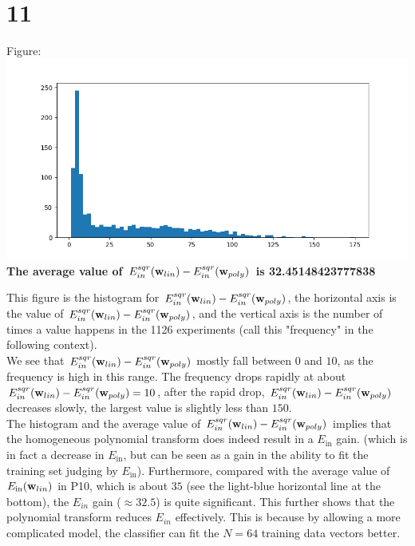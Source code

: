 \documentclass[11pt]{article}
\theoremstyle{definition}
\begin{document}
\section*{11}
Figure: \\
\includegraphics[width = \textwidth]{P11_fig_2.png}
\textbf{The average value of $E^{sqr}_{in}(\vb{w}_{lin}) - E^{sqr}_{in}(\vb{w}_{poly})$ is 32.45148423777838 } \\ 
\par
This figure is the histogram for $E^{sqr}_{in}(\vb{w}_{lin}) - E^{sqr}_{in}(\vb{w}_{poly})$, the horizontal axis is the value of $E^{sqr}_{in}(\vb{w}_{lin}) - E^{sqr}_{in}(\vb{w}_{poly})$, and the vertical axis is the number of times a value happens in the 1126 experiments (call this "frequency" in the following context). \\ 
We see that $E^{sqr}_{in}(\vb{w}_{lin}) - E^{sqr}_{in}(\vb{w}_{poly})$ mostly fall between $0$ and $10$, as the frequency is high in this range. The frequency drops rapidly at about $E^{sqr}_{in}(\vb{w}_{lin}) - E^{sqr}_{in}(\vb{w}_{poly}) = 10$, after the rapid drop, $E^{sqr}_{in}(\vb{w}_{lin}) - E^{sqr}_{in}(\vb{w}_{poly})$ decreases slowly, the largest value is slightly less than $150$. \\ 
The histogram and the average value of $E^{sqr}_{in}(\vb{w}_{lin}) - E^{sqr}_{in}(\vb{w}_{poly})$ implies that the homogeneous polynomial transform does indeed result in a $E_\text{in}$ gain. (which is in fact a decrease in $E_\text{in}$, but can be seen as a gain in the ability to fit the training set judging by $E_\text{in}$). Furthermore, compared with the average value of $E_\text{in}(\vb{w}_{lin})$ in P10, which is about $35$ (see the light-blue horizontal line at the bottom), the $E_{in}$ gain ($\approx 32.5$) is quite significant. This further shows that the polynomial transform reduces $E_{in}$ effectively. This is because by allowing a more complicated model, the classifier can fit the $N = 64$ training data vectors better.  \\
\end{document}
